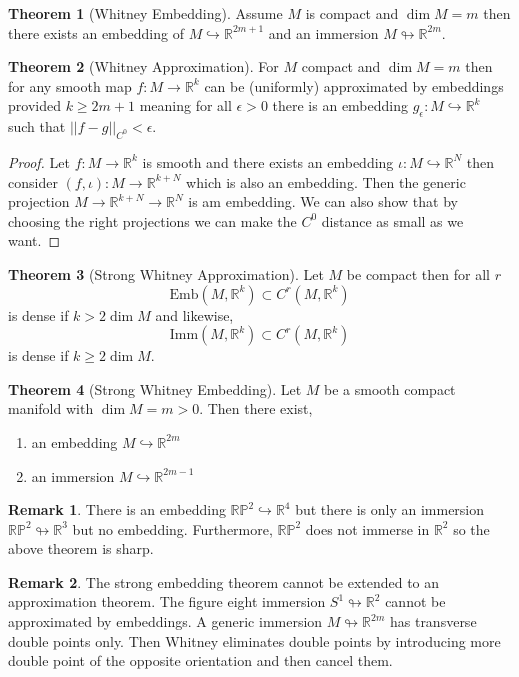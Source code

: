 \documentclass[12pt]{extarticle}
\newcommand{\R}{\mathbb{R}}
\theoremstyle{definition}
\newtheorem{theorem}{Theorem}[section]
\newtheorem{remark}{Remark}
\newcommand{\embed}{\hookrightarrow}
\newcommand{\imm}{\looparrowright}
\begin{document}
\begin{theorem}[Whitney Embedding]
Assume $M$ is compact and $\dim{M} = m$ then there exists an embedding of $M \embed \R^{2m + 1}$ and an immersion $M \imm \R^{2m}$.
\end{theorem}

\begin{theorem}[Whitney Approximation]
For $M$ compact and $\dim{M} = m$ then for any smooth map $f : M \to \R^k$ can be (uniformly) approximated by embeddings provided $k \ge 2 m + 1$ meaning for all $\epsilon > 0$ there is an embedding $g_\epsilon : M \embed \R^k$ such that $|| f - g ||_{C^0} < \epsilon$.
\end{theorem}

\begin{proof}
Let $f : M \to \R^k$ is smooth and there exists an embedding $\iota : M \embed \R^N$ then consider $(f, \iota) : M \to \R^{k + N}$ which is also an embedding. Then the generic projection $M \to \R^{k + N} \to \R^N$ is am embedding. We can also show that by choosing the right projections we can make the $C^0$ distance as small as we want.
\end{proof}

\begin{theorem}[Strong Whitney Approximation]
Let $M$ be compact then for all $r$ 
\[ \mathrm{Emb}(M, \R^k) \subset C^r(M, \R^k) \]
is dense if $k > 2 \dim{M}$ and likewise,
\[ \mathrm{Imm}(M, \R^k) \subset C^r(M, \R^k) \]
is dense if $k \ge 2 \dim{M}$. 
\end{theorem}

\begin{theorem}[Strong Whitney Embedding]
Let $M$ be a smooth compact manifold with $\dim{M} = m > 0$. Then there exist,
\begin{enumerate}
\item an embedding $M \embed \R^{2m}$
\item an immersion $M \embed \R^{2m - 1}$
\end{enumerate}
\end{theorem}

\newcommand{\RP}{\mathbb{RP}}

\begin{remark}
There is an embedding $\RP^2 \embed \R^4$ but there is only an immersion $\RP^2 \imm \R^3$ but no embedding. Furthermore, $\RP^2$ does not immerse in $\R^2$ so the above theorem is sharp. 
\end{remark}

\begin{remark}
The strong embedding theorem cannot be extended to an approximation theorem. The figure eight immersion $S^1 \imm \R^2$ cannot be approximated by embeddings. A generic immersion $M \imm \R^{2m}$ has transverse double points only. Then Whitney eliminates double points by introducing more double point of the opposite orientation and then cancel them. 
\end{remark}
\end{document}
